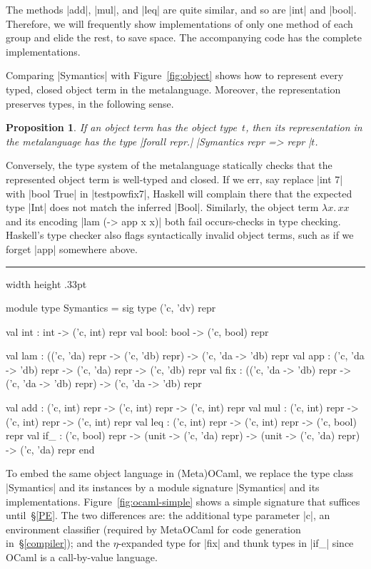 \documentclass[preprint]{sigplanconf}
\newtheorem{prop}{Proposition}
\newcommand{\fun}[1]{\mathopen{\lambda\mathord{#1}.\,}}
\newenvironment{floatrule}
    {\hrule width \hsize height .33pt \vspace{.5pc}}
    {\par\addvspace{1ex}}
\begin{document}
The methods |add|, |mul|, and |leq| are quite similar, and so are
|int| and |bool|. Therefore, we will frequently show implementations of
only one method of each group and elide the rest, to save space. The
accompanying code has the complete implementations.

Comparing |Symantics| with Figure~\ref{fig:object}
shows how to represent every typed, closed object term in the
metalanguage. Moreover, the representation preserves types, in the following
sense.
\begin{prop}
If an object term has the object type~$t$, then its
representation in the metalanguage has the type 
|forall repr.| |Symantics repr => repr |$t$.
\end{prop}
Conversely, the type system of the metalanguage statically checks that the
represented object term is well-typed and closed.
If we err, say replace |int 7| with |bool True| in
|testpowfix7|, Haskell will complain there that the expected type |Int| does not
match the inferred |Bool|.  Similarly, the object term $\fun{x}xx$ and its
encoding |lam (\x -> app x x)| both fail occurs-checks in type checking.
Haskell's type checker also flags syntactically invalid object terms, such as if
we forget |app| somewhere above.

\begin{figure*}
\begin{floatrule}
\begin{code}
module type Symantics = sig
  type ('c, 'dv) repr

  val int : int  -> ('c, int) repr
  val bool: bool -> ('c, bool) repr

  val lam : (('c, 'da) repr -> ('c, 'db) repr) -> ('c, 'da -> 'db) repr
  val app : ('c, 'da -> 'db) repr -> ('c, 'da) repr -> ('c, 'db) repr
  val fix : (('c, 'da -> 'db) repr -> ('c, 'da -> 'db) repr) -> ('c, 'da -> 'db) repr

  val add : ('c, int) repr -> ('c, int) repr -> ('c, int) repr
  val mul : ('c, int) repr -> ('c, int) repr -> ('c, int) repr
  val leq : ('c, int) repr -> ('c, int) repr -> ('c, bool) repr
  val if_ : ('c, bool) repr -> (unit -> ('c, 'da) repr) -> (unit -> ('c, 'da) repr) -> ('c, 'da) repr
end
\end{code}
\end{floatrule}
\caption{A simple (Meta)OCaml embedding of our object language}
\label{fig:ocaml-simple}
\end{figure*}

To embed the same object language in (Meta)OCaml, we replace the type
class |Symantics| and its instances by a module signature |Symantics|
and its implementations.  Figure~\ref{fig:ocaml-simple} shows a simple
signature that suffices until~\S\ref{PE}.  The two differences are:
the additional type parameter |c|, an
environment classifier \citep{WalidPOPL03} (required by MetaOCaml for
code generation in~\S\ref{compiler}); and the $\eta$-expanded type for
|fix| and thunk types in |if_| since OCaml is a call-by-value
language.
\end{document}

